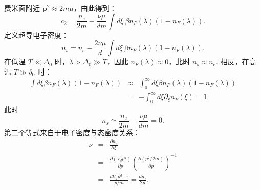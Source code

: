 \documentclass[10pt,UTF8]{ctexart}
\begin{document}
费米面附近 $\bm p^2 \approx 2m\mu$，由此得到：
\begin{equation}
	c_2 = \frac{n_e}{2m}-\frac{\nu \mu}{dm}\int d\xi \ \beta n_F(\lambda)(1-n_F(\lambda)).
\end{equation}
定义超导电子密度：
\begin{equation}
	n_s = n_e - \frac{2\nu \mu}{d} \int d\xi \ \beta n_F(\lambda)(1-n_F(\lambda)).
\end{equation}
在低温 $T \ll \Delta_0$ 时，$\lambda > \Delta_0 \gg T$，因此 $n_F(\lambda) \approx 0$，此时 $n_s \approx n_e$. 相反，在高温 $T \gg \delta_0$ 时：
\begin{eqnarray}
	\int d\xi \beta n_F(\lambda)(1-n_F(\lambda)) 
	&\approx & \int_0^{\infty} d\xi \beta n_F(\lambda)(1-n_F(\lambda)) \nonumber \\
	&=& - \int_0^{\infty}d\xi \partial_{\xi}n_F(\xi) = 1.
\end{eqnarray}
此时
\begin{equation}
	n_s \simeq \frac{n_e}{2m}-\frac{\nu \mu}{dm} = 0.
\end{equation}
第二个等式来自于电子密度与态密度关系：
\begin{eqnarray}
	\nu &=& \frac{\partial n_e}{\partial \xi} \nonumber \\
	&=& \frac{\partial (V_d p^d)}{\partial p} \left( \frac{\partial(p^2/2m)}{\partial p} \right)^{-1} \nonumber \\
	&=& \frac{d V_d p^{d-1}}{p/m} = \frac{d n_e}{2\mu}.
\end{eqnarray}
\end{document}
